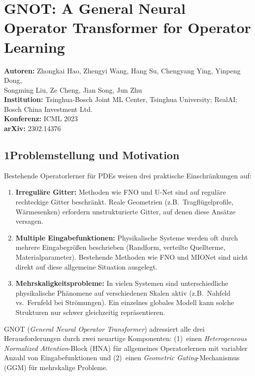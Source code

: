 \documentclass[a4paper,12pt]{article}
\begin{document}
\section*{GNOT: A General Neural Operator Transformer for Operator Learning}

\textbf{Autoren:} Zhongkai Hao, Zhengyi Wang, Hang Su, Chengyang Ying, Yinpeng Dong, \\
\hspace*{2.3cm} Songming Liu, Ze Cheng, Jian Song, Jun Zhu \\
\textbf{Institution:} Tsinghua-Bosch Joint ML Center, Tsinghua University; RealAI; Bosch China Investment Ltd. \\
\textbf{Konferenz:} ICML 2023 \\
\textbf{arXiv:} 2302.14376

\subsection*{1\quad Problemstellung und Motivation}

Bestehende Operatorlerner für PDEs weisen drei praktische Einschränkungen auf:
\begin{enumerate}
    \item \textbf{Irreguläre Gitter:} Methoden wie FNO und U-Net sind auf reguläre
    rechteckige Gitter beschränkt. Reale Geometrien (z.B.\ Tragflügelprofile, Wärmesenken)
    erfordern unstrukturierte Gitter, auf denen diese Ansätze versagen.

    \item \textbf{Multiple Eingabefunktionen:} Physikalische Systeme werden oft durch
    mehrere Eingabegrößen beschrieben (Randform, verteilte Quellterme, Materialparameter).
    Bestehende Methoden wie FNO und MIONet sind nicht direkt auf diese allgemeine
    Situation ausgelegt.

    \item \textbf{Mehrskaligkeitsprobleme:} In vielen Systemen sind unterschiedliche
    physikalische Phänomene auf verschiedenen Skalen aktiv (z.B.\ Nahfeld vs.\ Fernfeld
    bei Strömungen). Ein einzelnes globales Modell kann solche Strukturen nur schwer
    gleichzeitig repräsentieren.
\end{enumerate}

GNOT (\emph{General Neural Operator Transformer}) adressiert alle drei Herausforderungen
durch zwei neuartige Komponenten: (1)~einen \emph{Heterogeneous Normalized Attention}-Block
(HNA) für allgemeines Operatorlernen mit variabler Anzahl von Eingabefunktionen und
(2)~einen \emph{Geometric Gating}-Mechanismus (GGM) für mehrskalige Probleme.
\end{document}

